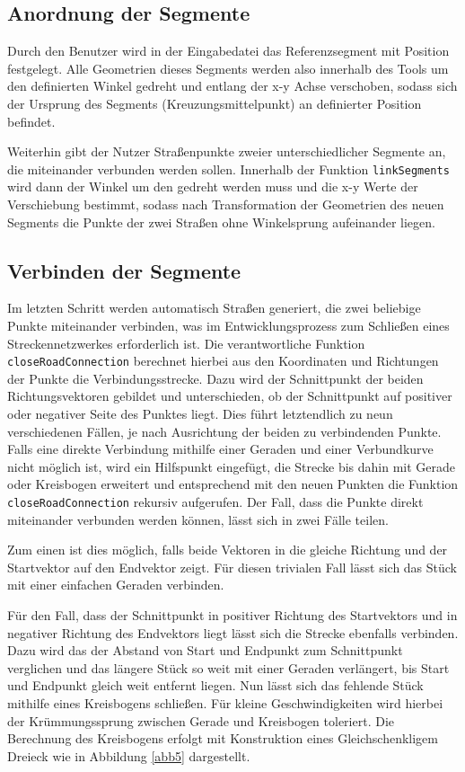 \subsection{Anordnung der Segmente}

Durch den Benutzer wird in der Eingabedatei das Referenzsegment mit Position festgelegt. Alle Geometrien dieses Segments werden also innerhalb des Tools um den definierten Winkel gedreht und entlang der x-y Achse verschoben, sodass sich der Ursprung des Segments (Kreuzungsmittelpunkt) an definierter Position befindet.

Weiterhin gibt der Nutzer Straßenpunkte zweier unterschiedlicher Segmente an, die miteinander verbunden werden sollen. Innerhalb der Funktion \texttt{linkSegments} wird dann der Winkel um den gedreht werden muss und die x-y Werte der Verschiebung bestimmt, sodass nach Transformation der Geometrien des neuen Segments die Punkte der zwei Straßen ohne Winkelsprung aufeinander liegen.

\subsection{Verbinden der Segmente}

Im letzten Schritt werden automatisch Straßen generiert, die zwei beliebige Punkte miteinander verbinden, was im Entwicklungsprozess zum Schließen eines Streckennetzwerkes erforderlich ist. Die verantwortliche Funktion \texttt{closeRoadConnection} berechnet hierbei aus den Koordinaten und Richtungen der Punkte die Verbindungsstrecke. Dazu wird der Schnittpunkt der beiden Richtungsvektoren gebildet und unterschieden, ob der Schnittpunkt auf positiver oder negativer Seite des Punktes liegt. Dies führt letztendlich zu neun verschiedenen Fällen, je nach Ausrichtung der beiden zu verbindenden Punkte. Falls eine direkte Verbindung mithilfe einer Geraden und einer Verbundkurve nicht möglich ist, wird ein Hilfspunkt eingefügt, die Strecke bis dahin mit Gerade oder Kreisbogen erweitert und entsprechend mit den neuen Punkten die Funktion \texttt{closeRoadConnection} rekursiv aufgerufen. Der Fall, dass die Punkte direkt miteinander verbunden werden können, lässt sich in zwei Fälle teilen.

Zum einen ist dies möglich, falls beide Vektoren in die gleiche Richtung und der Startvektor auf den Endvektor zeigt. Für diesen trivialen Fall lässt sich das Stück mit einer einfachen Geraden verbinden.

Für den Fall, dass der Schnittpunkt in positiver Richtung des Startvektors und in negativer Richtung des Endvektors liegt lässt sich die Strecke ebenfalls verbinden. Dazu wird das der Abstand von Start und Endpunkt zum Schnittpunkt verglichen und das längere Stück so weit mit einer Geraden verlängert, bis Start und Endpunkt gleich weit entfernt liegen. Nun lässt sich das fehlende Stück mithilfe eines Kreisbogens schließen. Für kleine Geschwindigkeiten wird hierbei der Krümmungssprung zwischen Gerade und Kreisbogen toleriert. Die Berechnung des Kreisbogens erfolgt mit Konstruktion eines Gleichschenkligem Dreieck wie in Abbildung \ref{abb5} dargestellt.

